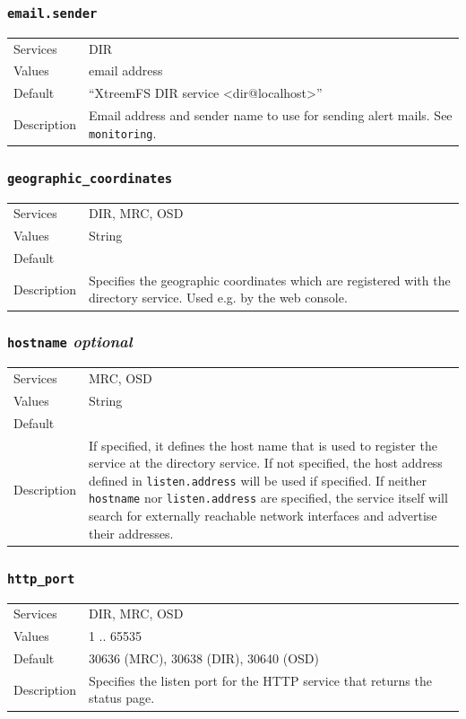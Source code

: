 \documentclass[a4paper,10pt]{book}
\begin{document}
\subsubsection{\texttt{email.sender}}
\begin{tabular}{lp{10cm}}
 Services & DIR\\
 Values   & email address \\
 Default  & ``XtreemFS DIR service <dir@localhost>''\\
 Description & Email address and sender name to use for sending alert mails. See \texttt{monitoring}.
\end{tabular}

\subsubsection{\texttt{geographic\_coordinates}}
\begin{tabular}{lp{10cm}}
 Services & DIR, MRC, OSD\\
 Values   & String \\
 Default  & \\
 Description & Specifies the geographic coordinates which are registered with the directory service. Used e.g. by the web console.
\end{tabular}

\subsubsection{\texttt{hostname} \textit{optional}}
\begin{tabular}{lp{10cm}}
 Services & MRC, OSD\\
 Values   & String \\
 Default  & \\
 Description & If specified, it defines the host name that is used to register the service at the directory service. If not specified, the host address defined in \texttt{listen.address} will be used if specified. If neither \texttt{hostname} nor \texttt{listen.address} are specified, the service itself will search for externally reachable network interfaces and advertise their addresses.
\end{tabular}

\subsubsection{\texttt{http\_port}}
\begin{tabular}{lp{10cm}}
 Services & DIR, MRC, OSD\\
 Values   & 1 .. 65535 \\
 Default  & 30636 (MRC), 30638 (DIR), 30640 (OSD)\\
 Description & Specifies the listen port for the HTTP service that returns the status page.
\end{tabular}
\end{document}
